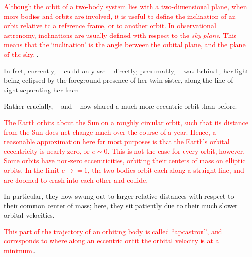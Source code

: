 \documentclass[main.tex]{subfiles}
\begin{document}
\begin{tcolorbox}[sharp corners, colback=red!30, colframe=red!80!blue, title=Orbital Inclination]
\par \textcolor{red}{ Although the orbit of a two-body system lies with a two-dimensional plane, when more bodies and orbits are involved, it is useful to define the inclination of an orbit relative to a reference frame, or to another orbit. In observational astronomy, inclinations are usually defined with respect to the {\it sky plane}. This means that the `inclination' is the angle between the orbital plane, and the plane of the sky. }.  
\end{tcolorbox}

\par \nar  In fact, currently, \rmcelaeno~ could only see \rmalcyone~ directly; presumably, \rmtaygete~ was behind \rmalcyone, her light being eclipsed by the foreground presence of her twin sister, along the line of sight separating her from \rmcelaeno.

\par \nar Rather crucially, \rmtaygete~ and \rmalcyone~ now shared a much more eccentric orbit than before.

\begin{tcolorbox}[sharp corners, colback=red!30, colframe=red!80!blue, title=Orbital Eccentricity]
\par \textcolor{red}{The Earth orbits about the Sun on a roughly circular orbit, such that its distance from the Sun does not change much over the course of a year.  Hence, a reasonable approximation here for most purposes is that the Earth's orbital eccentricity is nearly zero, or $e \sim 0$.  This is not the case for every orbit, however.  Some orbits have non-zero eccentricities, orbiting their centers of mass on elliptic orbits.  In the limit $e \rightarrow = 1$, the two bodies orbit each along a straight line, and are doomed to crash into each other and collide.}
\end{tcolorbox}

\par \nar In particular, they now swung out to larger relative distances with respect to their common center of mass; here, they sit patiently due to their much slower orbital velocities. 

\begin{tcolorbox}[sharp corners, colback=red!30, colframe=red!80!blue, title=Apoastron]
\par \textcolor{red} {This part of the trajectory of an orbiting body is called ``apoastron'', and corresponds to where along an eccentric orbit the orbital velocity is at a minimum.}.  
\end{tcolorbox}
\end{document}
